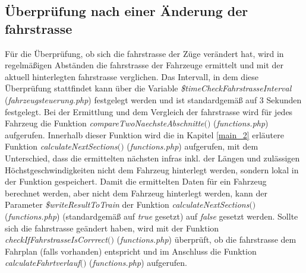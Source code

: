 \subsection{Überprüfung nach einer Änderung der \Gls{fahrstrasse}}
Für die Überprüfung, ob sich die \Gls{fahrstrasse} der Züge verändert hat, wird in regelmäßigen Abständen die \Gls{fahrstrasse} der Fahrzeuge ermittelt und mit der aktuell hinterlegten \Gls{fahrstrasse} verglichen. Das Intervall, in dem diese Überprüfung stattfindet kann über die Variable \textit{\$timeCheckFahrstrasseInterval} (\textit{fahrzeugsteuerung.php}) festgelegt werden und ist standardgemäß auf 3 Sekunden festgelegt. Bei der Ermittlung und dem Vergleich der \Gls{fahrstrasse} wird für jedes Fahrzeug die Funktion \textit{compare\-Two\-Naechste\-Abschnitte$($$)$} (\textit{functions.php}) aufgerufen. Innerhalb dieser Funktion wird die in Kapitel \ref{main_2} erläutere Funktion \textit{calculateNextSections$($$)$} (\textit{functions.php}) aufgerufen, mit dem Unterschied, dass die ermittelten nächsten \acp{infra} inkl. der Längen und zulässigen Höchstgeschwindigkeiten nicht dem Fahrzeug hinterlegt werden, sondern lokal in der Funktion gespeichert. Damit die ermittelten Daten für ein Fahrzeug berechnet werden, aber nicht dem Fahrzeug hinterlegt werden, kann der Parameter \textit{\$writeResultToTrain} der Funktion \textit{calculateNextSections$($$)$} (\textit{functions.php}) (standardgemäß auf \textit{true} gesetzt) auf \textit{false} gesetzt werden. Sollte sich die \Gls{fahrstrasse} geändert haben, wird mit der Funktion \textit{check\-If\-Fahr\-strasse\-Is\-Corrrect$($$)$} (\textit{functions.php}) überprüft, ob die \Gls{fahrstrasse} dem Fahrplan (falls vorhanden) entspricht und im Anschluss die Funktion \textit{cal\-cu\-late\-Fahrt\-verlauf$($$)$} (\textit{functions.php}) aufgerufen.
